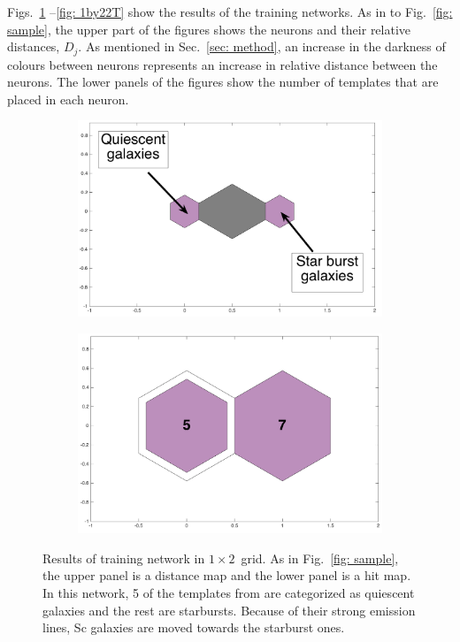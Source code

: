             Figs.~\ref{fig: 1by2T} --\ref{fig: 1by22T} show the results of the training networks.
            As in to Fig.~\ref{fig: sample}, the upper part of the figures shows the neurons and their relative distances, $D_j$.
            As mentioned in Sec.~\ref{sec: method}, an increase in the darkness of colours between neurons represents an increase in relative distance between the neurons.
            The lower panels of the figures show the number of  templates that are placed in each neuron. 
            \begin{figure}
                \begin{subfigure}[b]{0.5\textwidth}
                    \centering
                    \includegraphics[width=\textwidth]{../image_paper2/1d/dist_1_by_2.png}
                \end{subfigure}
                \hfill
                \begin{subfigure}[b]{0.5\textwidth}
                     \includegraphics[width=\textwidth]{../image_paper2/1d/hit_t_1_by_2.png}
                \end{subfigure}
                \caption{Results of training network in $1\times2$~grid. As in Fig.~\ref{fig: sample}, the upper panel is a distance map and the lower panel is a hit map. In this network, 5 of the templates from  are categorized as quiescent galaxies and the rest are starbursts. Because of their strong emission lines, Sc galaxies are moved towards the starburst ones.}
                 \label{fig: 1by2T}
            \end{figure}
        
